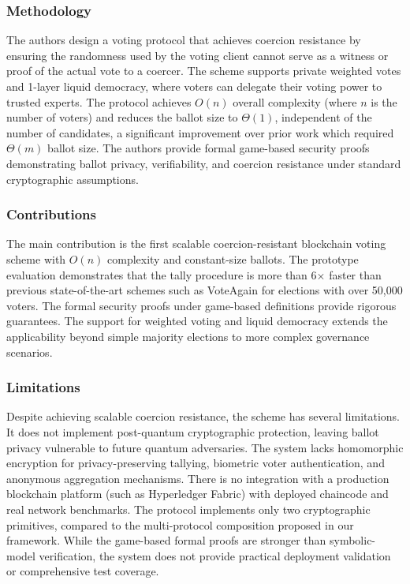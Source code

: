 \subsubsection{Methodology}
\label{subsubsec:yin-method}

The authors design a voting protocol that achieves coercion resistance by ensuring the randomness used by the voting client cannot serve as a witness or proof of the actual vote to a coercer. The scheme supports private weighted votes and 1-layer liquid democracy, where voters can delegate their voting power to trusted experts. The protocol achieves $O(n)$ overall complexity (where $n$ is the number of voters) and reduces the ballot size to $\Theta(1)$, independent of the number of candidates, a significant improvement over prior work which required $\Theta(m)$ ballot size. The authors provide formal game-based security proofs demonstrating ballot privacy, verifiability, and coercion resistance under standard cryptographic assumptions.

\subsubsection{Contributions}
\label{subsubsec:yin-contrib}

The main contribution is the first scalable coercion-resistant blockchain voting scheme with $O(n)$ complexity and constant-size ballots. The prototype evaluation demonstrates that the tally procedure is more than 6$\times$ faster than previous state-of-the-art schemes such as VoteAgain for elections with over 50,000 voters. The formal security proofs under game-based definitions provide rigorous guarantees. The support for weighted voting and liquid democracy extends the applicability beyond simple majority elections to more complex governance scenarios.

\subsubsection{Limitations}
\label{subsubsec:yin-limits}

Despite achieving scalable coercion resistance, the scheme has several limitations. It does not implement post-quantum cryptographic protection, leaving ballot privacy vulnerable to future quantum adversaries. The system lacks homomorphic encryption for privacy-preserving tallying, biometric voter authentication, and anonymous aggregation mechanisms. There is no integration with a production blockchain platform (such as Hyperledger Fabric) with deployed chaincode and real network benchmarks. The protocol implements only two cryptographic primitives, compared to the multi-protocol composition proposed in our framework. While the game-based formal proofs are stronger than symbolic-model verification, the system does not provide practical deployment validation or comprehensive test coverage.

